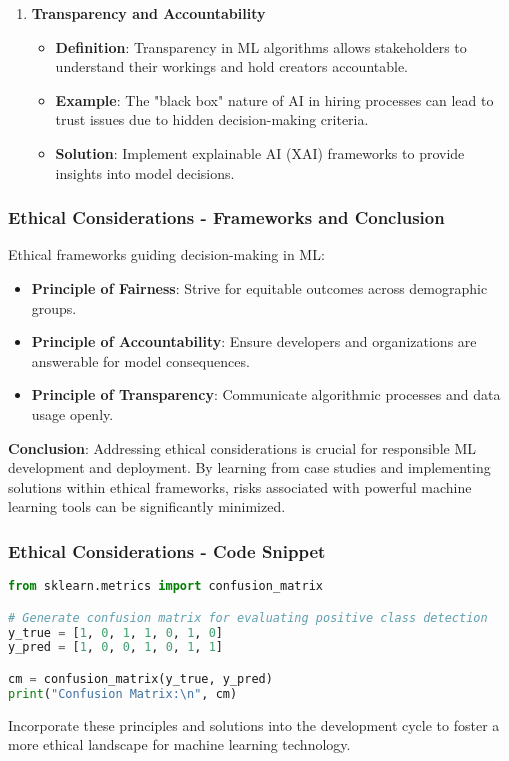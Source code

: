 \documentclass[aspectratio=169]{beamer}
\begin{document}
\begin{frame}[fragile]
\begin{enumerate}
        \item \textbf{Transparency and Accountability}
        \begin{itemize}
            \item \textbf{Definition}: Transparency in ML algorithms allows stakeholders to understand their workings and hold creators accountable.
            \item \textbf{Example}: The "black box" nature of AI in hiring processes can lead to trust issues due to hidden decision-making criteria.
            \item \textbf{Solution}: Implement explainable AI (XAI) frameworks to provide insights into model decisions.
        \end{itemize}
    \end{enumerate}
\end{frame}

\begin{frame}[fragile]
    \frametitle{Ethical Considerations - Frameworks and Conclusion}
    Ethical frameworks guiding decision-making in ML:
    \begin{itemize}
        \item \textbf{Principle of Fairness}: Strive for equitable outcomes across demographic groups.
        \item \textbf{Principle of Accountability}: Ensure developers and organizations are answerable for model consequences.
        \item \textbf{Principle of Transparency}: Communicate algorithmic processes and data usage openly.
    \end{itemize}
    
    \textbf{Conclusion}: Addressing ethical considerations is crucial for responsible ML development and deployment. By learning from case studies and implementing solutions within ethical frameworks, risks associated with powerful machine learning tools can be significantly minimized.
\end{frame}

\begin{frame}[fragile]
    \frametitle{Ethical Considerations - Code Snippet}
    \begin{lstlisting}[language=Python]
from sklearn.metrics import confusion_matrix

# Generate confusion matrix for evaluating positive class detection
y_true = [1, 0, 1, 1, 0, 1, 0]
y_pred = [1, 0, 0, 1, 0, 1, 1]

cm = confusion_matrix(y_true, y_pred)
print("Confusion Matrix:\n", cm)
    \end{lstlisting}
    Incorporate these principles and solutions into the development cycle to foster a more ethical landscape for machine learning technology.
\end{frame}
\end{document}
